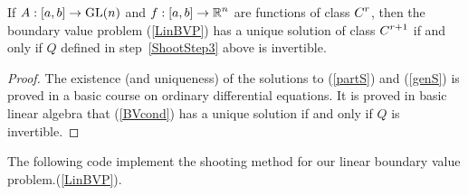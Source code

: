 \begin{theorem}
If $A:[a,b]\to \mathrm{GL}(n)$ and $\displaystyle f:[a,b]\to \mathbb{R}^n$ are functions of
class $\displaystyle C^r$, then the boundary value problem
(\ref{LinBVP}) has a unique solution of class $\displaystyle C^{r+1}$
if and only if $Q$ defined in step~\ref{ShootStep3} above is
invertible.  \label{BVPCdiff}
\end{theorem}

\begin{proof}
The existence (and uniqueness) of the solutions to
(\ref{partS}) and (\ref{genS}) is proved in a basic course on ordinary
differential equations.  It is proved in basic linear algebra that
(\ref{BVcond}) has a unique solution if and only if $Q$ is invertible.
\end{proof}

The following code implement the shooting method for our linear
boundary value problem.(\ref{LinBVP}).

